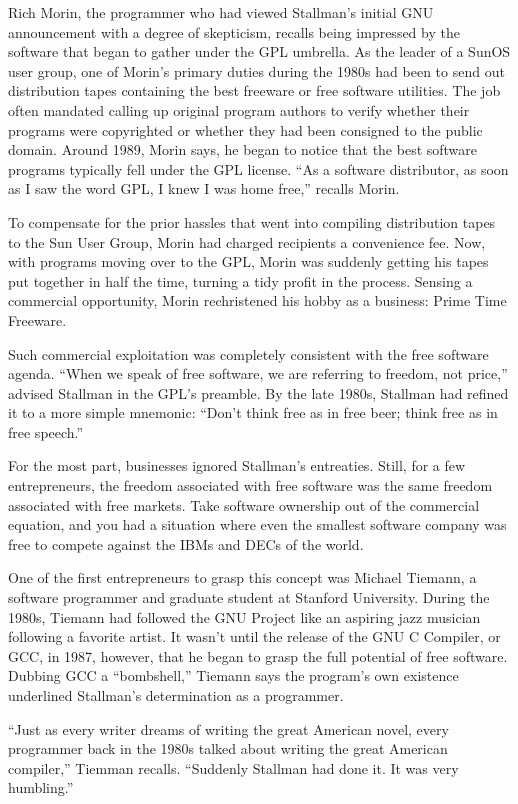 Rich Morin, the programmer who had viewed Stallman's initial GNU announcement with a degree of skepticism, recalls being impressed by the software that began to gather under the GPL umbrella. As the leader of a SunOS user group, one of Morin's primary duties during the 1980s had been to send out distribution tapes containing the best freeware or free software utilities. The job often mandated calling up original program authors to verify whether their programs were copyrighted or whether they had been consigned to the public domain. Around 1989, Morin says, he began to notice that the best software programs typically fell under the GPL license. ``As a software distributor, as soon as I saw the word GPL, I knew I was home free,'' recalls Morin.

To compensate for the prior hassles that went into compiling distribution tapes to the Sun User Group, Morin had charged recipients a convenience fee. Now, with programs moving over to the GPL, Morin was suddenly getting his tapes put together in half the time, turning a tidy profit in the process. Sensing a commercial opportunity, Morin rechristened his hobby as a business: Prime Time Freeware.

Such commercial exploitation was completely consistent with the free software agenda. ``When we speak of free software, we are referring to freedom, not price,'' advised Stallman in the GPL's preamble. By the late 1980s, Stallman had refined it to a more simple mnemonic: ``Don't think free as in free beer; think free as in free speech.''

For the most part, businesses ignored Stallman's entreaties. Still, for a few entrepreneurs, the freedom associated with free software was the same freedom associated with free markets. Take software ownership out of the commercial equation, and you had a situation where even the smallest software company was free to compete against the IBMs and DECs of the world.

One of the first entrepreneurs to grasp this concept was Michael Tiemann, a software programmer and graduate student at Stanford University. During the 1980s, Tiemann had followed the GNU Project like an aspiring jazz musician following a favorite artist. It wasn't until the release of the GNU C Compiler, or GCC, in 1987, however, that he began to grasp the full potential of free software. Dubbing GCC a ``bombshell,'' Tiemann says the program's own existence underlined Stallman's determination as a programmer.

``Just as every writer dreams of writing the great American novel, every programmer back in the 1980s talked about writing the great American compiler,'' Tiemman recalls. ``Suddenly Stallman had done it. It was very humbling.''

